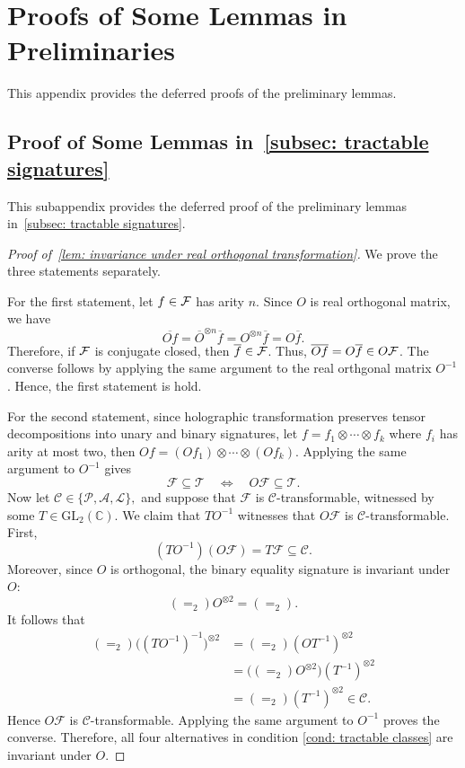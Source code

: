 \section{Proofs of Some Lemmas in Preliminaries}\label{app: disequality reduction}
This appendix provides the deferred proofs of the preliminary lemmas.

\subsection{Proof of Some Lemmas in~\cref{subsec: tractable signatures}}\label{subapp: proof of subsec tractable signature}
This subappendix provides the deferred proof of the preliminary lemmas in~\cref{subsec: tractable signatures}.


\InvarianceUnderRealOrth*
\begin{proof}[Proof of~\cref{lem: invariance under real orthogonal transformation}]
    We prove the three statements separately.

    For the first statement, let $f\in \mathcal{F}$ has arity $n$. Since $O$ is real orthogonal matrix,
    we have 
    \begin{equation}
        \overline{Of}
        =\overline{O}^{\otimes n}\overline f 
        =O^{\otimes n}\overline f 
        =O\overline f.
    \end{equation}
    Therefore, if $\mathcal{F}$ is conjugate closed, then $\overline{f}\in \mathcal{F}$. Thus, $\overline{Of}=O\overline f\in O\mathcal{F}$. The converse follows by applying the same argument to the real orthgonal matrix $O^{-1}$. Hence, the first statement is hold.

    For the second statement, since holographic transformation preserves tensor decompositions into unary and binary signatures, let $f=f_1\otimes \cdots \otimes f_k$ where $f_i$ has arity at most two, then $Of=(Of_1)\otimes \cdots \otimes (Of_k)$.
    Applying the same argument to $O^{-1}$ gives
\[
    \mathcal F\subseteq\mathscr T
    \quad\Longleftrightarrow\quad
    O\mathcal F\subseteq\mathscr T.
\]
Now let
$
    \mathscr C\in\{\mathscr P,\mathscr A,\mathscr L\},
$
and suppose that $\mathcal F$ is $\mathscr C$-transformable, witnessed
by some $T\in\mathrm{GL}_2(\mathbb C)$. We claim that $TO^{-1}$
witnesses that $O\mathcal F$ is $\mathscr C$-transformable. First,
\[
    (TO^{-1})(O\mathcal F)
    =T\mathcal F
    \subseteq\mathscr C.
\]
Moreover, since $O$ is orthogonal, the binary equality signature is
invariant under $O$:
\[
    (=_2)O^{\otimes 2}=(=_2).
\]
It follows that
\[
\begin{aligned}
    (=_2)\bigl((TO^{-1})^{-1}\bigr)^{\otimes 2}
    &=(=_2)(OT^{-1})^{\otimes 2}\\
    &=\bigl((=_2)O^{\otimes 2}\bigr)
      (T^{-1})^{\otimes 2}\\
    &=(=_2)(T^{-1})^{\otimes 2}
      \in\mathscr C.
\end{aligned}
\]
Hence $O\mathcal F$ is $\mathscr C$-transformable. Applying the same
argument to $O^{-1}$ proves the converse. Therefore, all four
alternatives in condition \eqref{cond: tractable classes} are
invariant under $O$.


\end{proof}
